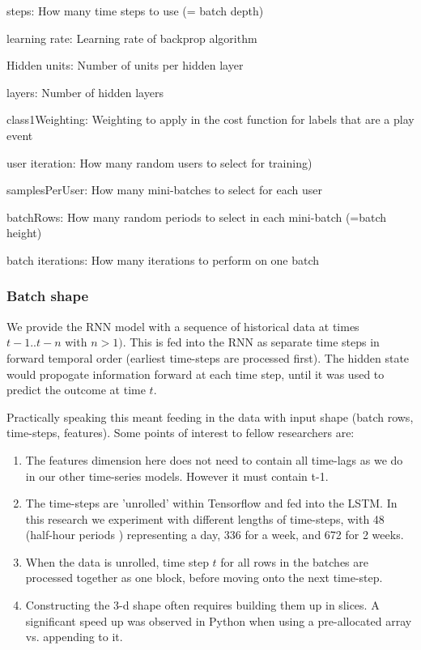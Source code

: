 \begin{list}{-}{spacing}
	\item steps: How many time steps to use (= batch depth)
	\item learning rate: Learning rate of backprop algorithm
	\item Hidden units: Number of units per hidden layer
	\item layers: Number of hidden layers
	\item class1Weighting: Weighting to apply in the cost function for labels that are a play event
	\item user iteration: How many random users to select for training)
	\item samplesPerUser: How many mini-batches to select for each user
	\item batchRows: How many random periods to select in each mini-batch (=batch height)
	\item batch iterations: How many iterations to perform on one batch
\end{list}

\subsubsection{Batch shape}

We provide the RNN model with a sequence of historical data at times $t-1 .. t-n$ with $n >1)$. This is fed into the RNN as separate time steps in forward temporal order (earliest time-steps are processed first). The hidden state would propogate information forward at each time step, until it was used to predict the outcome at time $t$.

Practically speaking this meant feeding in the data with input shape (batch rows, time-steps, features). Some points of interest to fellow researchers are:

\begin{enumerate}
	\item The features dimension here does not need to contain all time-lags as we do in our other time-series models. However it must contain t-1. 
		
	\item The time-steps are 'unrolled' within Tensorflow and fed into the LSTM. In this research we experiment with different lengths of time-steps, with 48 (half-hour periods ) representing a day, 336 for a week, and 672 for 2 weeks.

	\item When the data is unrolled, time step $t$ for all rows in the batches are processed together as one block, before moving onto the next time-step.

	\item Constructing the 3-d shape often requires building them up in slices. A significant speed up was observed in Python when using a pre-allocated array vs. appending to it.
\end{enumerate}

